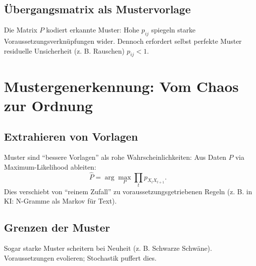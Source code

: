 	\subsection{Übergangsmatrix als Mustervorlage}
	Die Matrix $P$ kodiert erkannte Muster: Hohe $p_{ij}$ spiegeln starke Voraussetzungsverknüpfungen wider. Dennoch erfordert selbst perfekte Muster residuelle Unsicherheit (z. B. Rauschen) $p_{ij} < 1$.
	
	\begin{table}[h]
		\centering
		\caption{Determinismus vs. Stochastik in Markov-Ketten}
		\label{tab:comparison}
	\end{table}
	
	\section{Mustergenerkennung: Vom Chaos zur Ordnung}
	\label{sec:patterns}
	
	\subsection{Extrahieren von Vorlagen}
	Muster sind ``bessere Vorlagen'' als rohe Wahrscheinlichkeiten: Aus Daten $P$ via Maximum-Likelihood ableiten:
	\begin{equation}
		\hat{P} = \arg\max_P \prod_t p_{X_t X_{t+1}}.
	\end{equation}
	Dies verschiebt von ``reinem Zufall'' zu voraussetzungsgetriebenen Regeln (z. B. in KI: N-Gramme als Markov für Text).
	
	\subsection{Grenzen der Muster}
	Sogar starke Muster scheitern bei Neuheit (z. B. Schwarze Schwäne). Voraussetzungen evolieren; Stochastik puffert dies.
	
